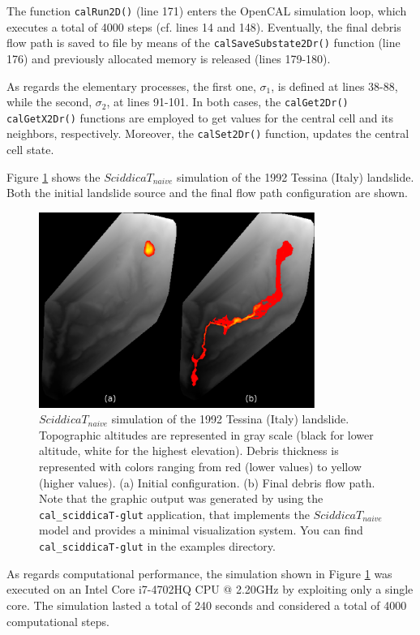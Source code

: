The function \verb'calRun2D()' (line 171) enters the OpenCAL
simulation loop, which executes a total of 4000 steps (cf. lines 14
and 148). Eventually, the final debris flow path is saved to file by
means of the \verb'calSaveSubstate2Dr()' function (line 176) and
previously allocated memory is released (lines 179-180).

As regards the elementary processes, the first one, $\sigma_1$, is
defined at lines 38-88, while the second, $\sigma_2$, at lines
91-101. In both cases, the \verb'calGet2Dr()' \verb'calGetX2Dr()'
functions are employed to get values for the central cell and its
neighbors, respectively. Moreover, the \verb'calSet2Dr()' function,
updates the central cell state.

Figure \ref{fig:sciddicaT} shows the $SciddicaT_{naive}$ simulation of the 1992
Tessina (Italy) landslide. Both the initial landslide source and the
final flow path configuration are shown.

\begin{figure}[htbp]
  \centering
  \includegraphics[width=9cm]{./images/OpenCAL/sciddicaT}
  \caption{$SciddicaT_{naive}$ simulation of the 1992 Tessina (Italy)
    landslide. Topographic altitudes are represented in gray scale
    (black for lower altitude, white for the highest
    elevation). Debris thickness is represented with colors ranging
    from red (lower values) to yellow (higher values). (a) Initial
    configuration. (b) Final debris flow path. Note that the graphic
    output was generated by using the \texttt{cal\_sciddicaT-glut}
    application, that implements the $SciddicaT_{naive}$ model and
    provides a minimal visualization system. You can find
    \texttt{cal\_sciddicaT-glut} in the examples directory.}
  \label{fig:sciddicaT}
\end{figure}

As regards computational performance, the simulation shown in Figure
\ref{fig:sciddicaT} was executed on an Intel Core i7-4702HQ CPU @
2.20GHz by exploiting only a single core. The simulation lasted a
total of 240 seconds and considered a total of 4000 computational
steps.


